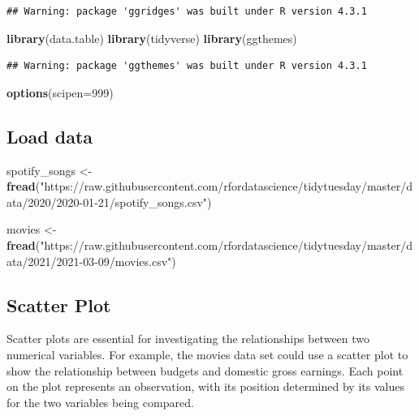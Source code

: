 \documentclass[
  b5paper]{book}
\newenvironment{Shaded}{\begin{snugshade}}{\end{snugshade}}
\newcommand{\AttributeTok}[1]{\textcolor[rgb]{0.13,0.29,0.53}{#1}}
\newcommand{\DecValTok}[1]{\textcolor[rgb]{0.00,0.00,0.81}{#1}}
\newcommand{\FunctionTok}[1]{\textcolor[rgb]{0.13,0.29,0.53}{\textbf{#1}}}
\newcommand{\NormalTok}[1]{#1}
\newcommand{\OtherTok}[1]{\textcolor[rgb]{0.56,0.35,0.01}{#1}}
\newcommand{\StringTok}[1]{\textcolor[rgb]{0.31,0.60,0.02}{#1}}
\begin{document}
\begin{verbatim}
## Warning: package 'ggridges' was built under R version 4.3.1
\end{verbatim}

\begin{Shaded}
\begin{Highlighting}[]
\FunctionTok{library}\NormalTok{(data.table)}
\FunctionTok{library}\NormalTok{(tidyverse)}
\FunctionTok{library}\NormalTok{(ggthemes)}
\end{Highlighting}
\end{Shaded}

\begin{verbatim}
## Warning: package 'ggthemes' was built under R version 4.3.1
\end{verbatim}

\begin{Shaded}
\begin{Highlighting}[]
\FunctionTok{options}\NormalTok{(}\AttributeTok{scipen=}\DecValTok{999}\NormalTok{)}
\end{Highlighting}
\end{Shaded}

\hypertarget{load-data}{%
\subsection*{Load data}\label{load-data}}

\begin{Shaded}
\begin{Highlighting}[]
\NormalTok{spotify\_songs }\OtherTok{\textless{}{-}} \FunctionTok{fread}\NormalTok{(}\StringTok{"https://raw.githubusercontent.com/rfordatascience/tidytuesday/master/data/2020/2020{-}01{-}21/spotify\_songs.csv"}\NormalTok{)}

\NormalTok{movies }\OtherTok{\textless{}{-}} \FunctionTok{fread}\NormalTok{(}\StringTok{"https://raw.githubusercontent.com/rfordatascience/tidytuesday/master/data/2021/2021{-}03{-}09/movies.csv"}\NormalTok{)}
\end{Highlighting}
\end{Shaded}

\hypertarget{scatter-plot}{%
\subsection*{Scatter Plot}\label{scatter-plot}}

Scatter plots are essential for investigating the relationships between two numerical variables. For example, the movies data set could use a scatter plot to show the relationship between budgets and domestic gross earnings. Each point on the plot represents an observation, with its position determined by its values for the two variables being compared.
\end{document}
